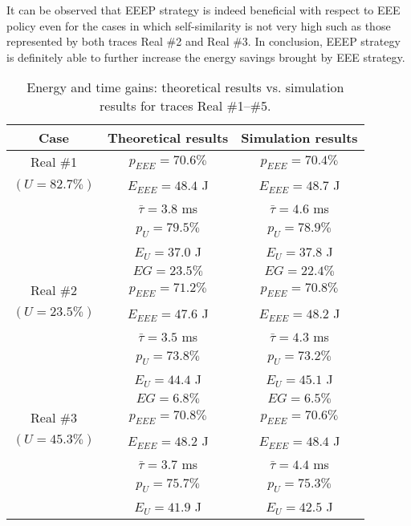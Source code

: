 \documentclass[journal,10pt,twoside,final]{IEEEtran}
\begin{document}
It can be observed that EEEP strategy is indeed beneficial with respect to EEE policy even for the cases in which self-similarity is not very high such as those represented by both traces Real \#2 and Real \#3. In conclusion, EEEP strategy is definitely able to further increase the energy savings brought by EEE strategy.

\begin{table}[h]
\caption{Energy and time gains: theoretical results vs. simulation results for traces Real \#1--\#5.}
\label{tab:results2}
\centering
\begin{tabular}{|c|c|c|}
\hline 
Case & Theoretical results & Simulation results\\
\hline 
\hline  
Real \#1          & $p_{EEE} = 70.6 \%$     & $p_{EEE} = 70.4 \%$\\
$( U = 82.7\% )$  & $E_{EEE} = 48.4 $ J     & $E_{EEE} = 48.7 $ J\\ \cline{2-3}
                  & $\bar{\tau} = 3.8$ ms   & $\bar{\tau} = 4.6$ ms\\         
                  & $p_{U} = 79.5 \%$    & $p_{U} = 78.9 \%$ \\
                  & $E_{U} = 37.0 $ J    & $E_{U} = 37.8 $ J\\ \cline{2-3}
                  & $EG = 23.5 \%$ & $EG = 22.4 \%$\\                       
\hline
\hline
Real \#2          & $p_{EEE} = 71.2 \%$     & $p_{EEE} = 70.8 \%$\\
$( U = 23.5\% )$  & $E_{EEE} = 47.6 $ J     & $E_{EEE} = 48.2 $ J \\  \cline{2-3}
                  & $\bar{\tau} = 3.5$ ms   & $\bar{\tau} = 4.3$ ms\\         
                  & $p_{U} = 73.8 \%$    & $p_{U} = 73.2 \%$ \\
                  & $E_{U} = 44.4 $ J    & $E_{U} = 45.1 $ J\\  \cline{2-3}
                  & $EG = 6.8 \%$ & $EG = 6.5 \%$\\                       
\hline
\hline
Real \#3          & $p_{EEE} = 70.8 \%$     & $p_{EEE} = 70.6 \%$\\
$( U = 45.3\% )$  & $E_{EEE} = 48.2 $ J     & $E_{EEE} = 48.4 $ J \\ \cline{2-3}
                  & $\bar{\tau} = 3.7$ ms   & $\bar{\tau} = 4.4$ ms\\         
                  & $p_{U} = 75.7 \%$    & $p_{U} = 75.3 \%$ \\
                  & $E_{U} = 41.9 $ J    & $E_{U} = 42.5 $ J\\  \cline{2-3}

\end{tabular}
\end{table}
\end{document}
